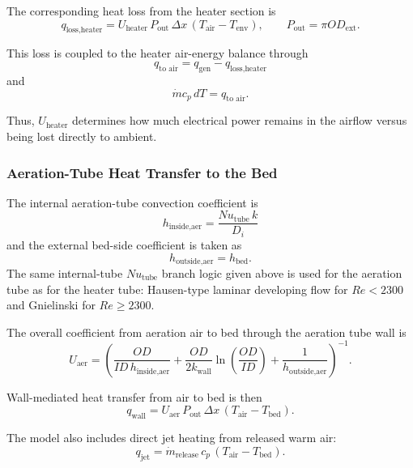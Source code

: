 \documentclass{article}
\begin{document}
The corresponding heat loss from the heater section is
\begin{equation}
q_{\text{loss,heater}}
=
U_{\text{heater}}\,P_{\text{out}}\,\Delta x\,
\left(T_{\text{air}}-T_{\text{env}}\right),
\qquad
P_{\text{out}}=\pi OD_{\text{ext}}.
\end{equation}

This loss is coupled to the heater air-energy balance through
\begin{equation}
q_{\text{to air}}=q_{\text{gen}}-q_{\text{loss,heater}}
\end{equation}
and
\begin{equation}
\dot m c_p\,dT=q_{\text{to air}}.
\end{equation}

Thus, $U_{\text{heater}}$ determines how much electrical power remains in the
airflow versus being lost directly to ambient.

\subsubsection{Aeration-Tube Heat Transfer to the Bed}

The internal aeration-tube convection coefficient is
\begin{equation}
h_{\text{inside,aer}}=\frac{Nu_{\text{tube}}\,k}{D_i}
\end{equation}
and the external bed-side coefficient is taken as
\begin{equation}
h_{\text{outside,aer}}=h_{\text{bed}}.
\end{equation}
The same internal-tube $Nu_{\text{tube}}$ branch logic given above is used
for the aeration tube as for the heater tube: Hausen-type laminar developing
flow for $Re<2300$ and Gnielinski for $Re\ge 2300$.

The overall coefficient from aeration air to bed through the aeration tube
wall is
\begin{equation}
U_{\text{aer}}
=
\left(
\frac{OD}{ID\,h_{\text{inside,aer}}}
+\frac{OD}{2k_{\text{wall}}}\ln\!\left(\frac{OD}{ID}\right)
+\frac{1}{h_{\text{outside,aer}}}
\right)^{-1}.
\end{equation}

Wall-mediated heat transfer from air to bed is then
\begin{equation}
q_{\text{wall}}
=
U_{\text{aer}}\,P_{\text{out}}\,\Delta x\,
\left(T_{\text{air}}-T_{\text{bed}}\right).
\end{equation}

The model also includes direct jet heating from released warm air:
\begin{equation}
q_{\text{jet}}
=
\dot m_{\text{release}}\,c_p\,
\left(T_{\text{air}}-T_{\text{bed}}\right).
\end{equation}
\end{document}

